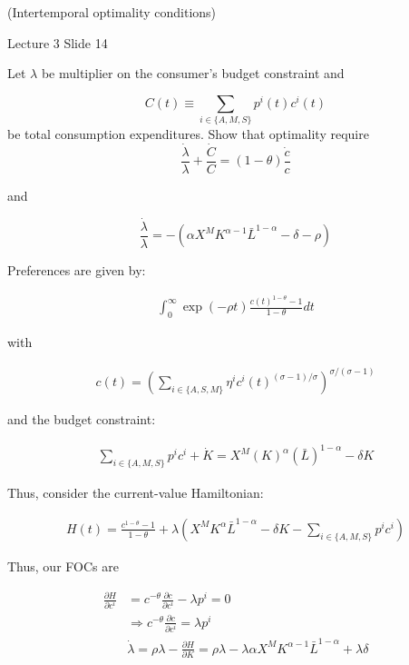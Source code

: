 (Intertemporal optimality conditions)

Lecture 3 Slide 14

Let $\lambda$ be multiplier on the consumer's budget constraint and

$$
C(t) \equiv \sum_{i \in\{A, M, S\}} p^i(t) c^i(t)
$$
be total consumption expenditures. Show that optimality require
$$
\frac{\dot{\lambda}}{\lambda}+\frac{\dot{C}}{C}=(1-\theta) \frac{\dot{c}}{c}
$$

and

$$
\frac{\dot{\lambda}}{\lambda}=-\left(\alpha X^M K^{\alpha-1} \bar{L}^{1-\alpha}-\delta-\rho\right)
$$


Preferences are given by:

\begin{align}
    \int_0^{\infty} \exp (-\rho t) \frac{c(t)^{1-\theta}-1}{1-\theta} d t
\end{align}

with 

\begin{align}
    c(t)=\left(\sum_{i \in\{A, S, M\}} \eta^i c^i(t)^{(\sigma-1) / \sigma}\right)^{\sigma /(\sigma-1)}
\end{align}

and the budget constraint:

\begin{align}
    \sum_{i \in\{A, M, S\}} p^i c^i+\dot{K}=X^M(K)^\alpha(\bar{L})^{1-\alpha}-\delta K
\end{align}

Thus, consider the current-value Hamiltonian:

\begin{align}
    H(t) = \frac{c^{1-\theta}-1}{1-\theta} + \lambda \left(X^M K^{\alpha} \bar{L}^{1-\alpha}-\delta K - \sum_{i \in\{A, M, S\}} p^i c^i\right)
\end{align}

Thus, our FOCs are 

\begin{align}
    \frac{\partial H}{\partial c^i} &= c^{-\theta} \frac{\partial c}{\partial c^i} - \lambda p^i = 0 \\
    &\Rightarrow c^{-\theta}\frac{\partial c}{\partial c^i} = \lambda p^i \\
    & \dot{\lambda} = \rho \lambda - \frac{\partial H}{\partial K} = \rho \lambda - \lambda \alpha X^M K^{\alpha-1} \bar{L}^{1-\alpha} + \lambda \delta \\
\end{align}

